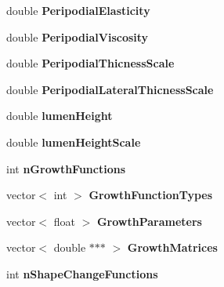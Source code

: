 \begin{DoxyCompactItemize}
\item 
\hypertarget{classSimulation_a3d8435d5bedf3810cb12138538169d9c}{}double {\bfseries Peripodial\+Elasticity}\label{classSimulation_a3d8435d5bedf3810cb12138538169d9c}

\item 
\hypertarget{classSimulation_a53ed2b18ee5786cba3dde8d69a7f21df}{}double {\bfseries Peripodial\+Viscosity}\label{classSimulation_a53ed2b18ee5786cba3dde8d69a7f21df}

\item 
\hypertarget{classSimulation_a1b5fd33e66ce33ae07ba854785735162}{}double {\bfseries Peripodial\+Thicness\+Scale}\label{classSimulation_a1b5fd33e66ce33ae07ba854785735162}

\item 
\hypertarget{classSimulation_a1614132f37b02b184661370a188d9b74}{}double {\bfseries Peripodial\+Lateral\+Thicness\+Scale}\label{classSimulation_a1614132f37b02b184661370a188d9b74}

\item 
\hypertarget{classSimulation_a661531b9180d4b893f4f0221fe518b7b}{}double {\bfseries lumen\+Height}\label{classSimulation_a661531b9180d4b893f4f0221fe518b7b}

\item 
\hypertarget{classSimulation_a1a4bdb2cb7810665b95bd884dfa19adc}{}double {\bfseries lumen\+Height\+Scale}\label{classSimulation_a1a4bdb2cb7810665b95bd884dfa19adc}

\item 
\hypertarget{classSimulation_a47187b5d7f450b1c41e6fdaffeedc207}{}int {\bfseries n\+Growth\+Functions}\label{classSimulation_a47187b5d7f450b1c41e6fdaffeedc207}

\item 
\hypertarget{classSimulation_aa94f0cfa6a70cc5bcfee5ba7eecb8dd4}{}vector$<$ int $>$ {\bfseries Growth\+Function\+Types}\label{classSimulation_aa94f0cfa6a70cc5bcfee5ba7eecb8dd4}

\item 
\hypertarget{classSimulation_ad4e55d4978e84f7fc8db37b37056015e}{}vector$<$ float $>$ {\bfseries Growth\+Parameters}\label{classSimulation_ad4e55d4978e84f7fc8db37b37056015e}

\item 
\hypertarget{classSimulation_a8cdab34c42a949aeeaa2b76fe5cf7d76}{}vector$<$ double $\ast$$\ast$$\ast$ $>$ {\bfseries Growth\+Matrices}\label{classSimulation_a8cdab34c42a949aeeaa2b76fe5cf7d76}

\item 
\hypertarget{classSimulation_a74251252e9f320268055537749d674c1}{}int {\bfseries n\+Shape\+Change\+Functions}\label{classSimulation_a74251252e9f320268055537749d674c1}


\end{DoxyCompactItemize}
